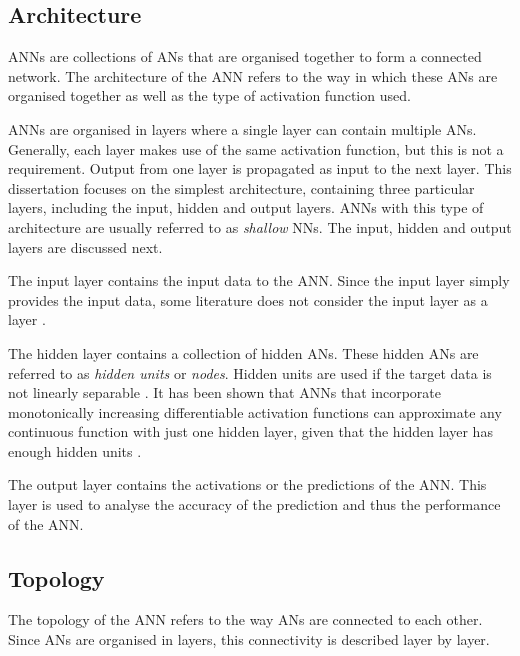\subsection{Architecture}
\label{sec:anns:anns:architecture}

\acp{ANN} are collections of \acp{AN} that are organised together to form a
connected network. The architecture of the \ac{ANN} refers to the way in which
these \acp{AN} are organised together as well as the type of activation function used.

\acp{ANN} are organised in layers where a single layer can contain multiple
\acp{AN}. Generally, each layer makes use of the same activation function, but this is not a requirement. Output from one
layer is propagated as input to the next layer. This dissertation focuses on the
simplest architecture, containing three particular layers, including the input,
hidden and output layers. \acp{ANN} with this type of architecture are usually
referred to as \textit{shallow} \acp{NN}. The input, hidden and output layers
are discussed next.

The input layer contains the input data to the \ac{ANN}. Since the
input layer simply provides the input data, some literature does not consider
the input layer as a layer \cite{ref:engelbrecht:2007}.

The hidden layer contains a collection of hidden \acp{AN}. These hidden \acp{AN}
are referred to as \textit{hidden units} or \textit{nodes}. Hidden units are
used if the target data is not linearly separable \cite{ref:engelbrecht:2007}.
It has been shown that \acp{ANN} that incorporate monotonically increasing
differentiable activation functions can approximate
any continuous function with just one hidden layer, given that the hidden layer
has enough hidden units \cite{ref:hornik:1989}. 

The output layer contains the activations or the predictions of the \ac{ANN}.
This layer is used to analyse the accuracy of the prediction and thus the
performance of the \ac{ANN}.


\subsection{Topology}
\label{sec:anns:anns:topology}

The topology of the \ac{ANN} refers to the way \acp{AN} are connected to each
other. Since \acp{AN} are organised in layers, this connectivity is described
layer by layer.

